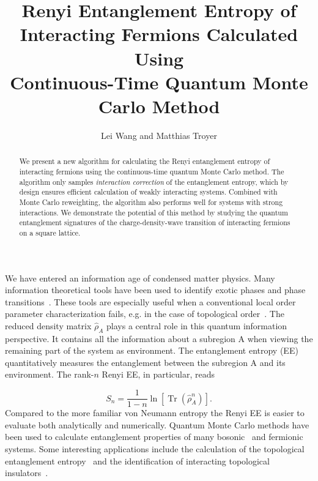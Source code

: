 \documentclass[twocolumn,english,prl,showpacs]{revtex4}
\DeclareMathOperator{\Tr}{Tr}
\begin{document}
\title{Renyi Entanglement Entropy of Interacting Fermions Calculated Using \\Continuous-Time Quantum Monte Carlo Method}

\author{Lei Wang and Matthias Troyer}

\begin{abstract}
We present a new algorithm for calculating the Renyi entanglement entropy of interacting fermions using the continuous-time quantum Monte Carlo method. The algorithm only samples  \emph{interaction correction} of the entanglement entropy, which by design ensures efficient calculation of  weakly interacting systems. Combined with Monte Carlo reweighting, the algorithm also performs well for systems with strong interactions. We demonstrate the potential of this method by studying the quantum entanglement signatures of the charge-density-wave transition of interacting fermions on a square lattice.  
\end{abstract}



\maketitle

We have entered an information age of condensed matter physics. Many information theoretical tools have been used to identify exotic phases and phase transitions~\cite{Feiguin:2007bo, PhysRevLett.99.140405, Isakov:2011fz, Jiang:2012dw, PhysRevLett.109.067201}. These tools are especially useful when a conventional local order parameter characterization fails, e.g. in the case of topological order~\cite{Wen:1990tm}. The reduced density matrix $\hat{\rho}_{A}$ plays a central role in this quantum information perspective. It contains all the information about a subregion A when viewing the remaining part of the system as environment. The entanglement entropy (EE) quantitatively measures the entanglement between the subregion A and its environment. The rank-$n$ Renyi EE, in particular, reads

\begin{equation}
S_{n} = \frac{1}{1-n}\ln \left[\Tr (\hat{\rho}_{A}^{n})\right].
\label{eq:REE}
\end{equation}
Compared to the more familiar von Neumann entropy the Renyi EE is easier to evaluate both analytically and numerically. Quantum Monte Carlo methods have been used to calculate entanglement properties of many bosonic~\cite{Buividovich:2008hz, Hastings:2010dca, Herdman:2014jqa} and fermionic~\cite{Zhang:2011ka, McMinis:2013dp, Grover:2013cs, Broecker:2014ud} systems. Some interesting applications include the calculation of the topological entanglement entropy~\cite{Levin:2006ij, Kitaev:2006dn, Isakov:2011fz} and the identification of interacting topological insulators~\cite{2014PhRvB..89l5121A, Anonymous:XiXakTeu}. 
\end{document}
